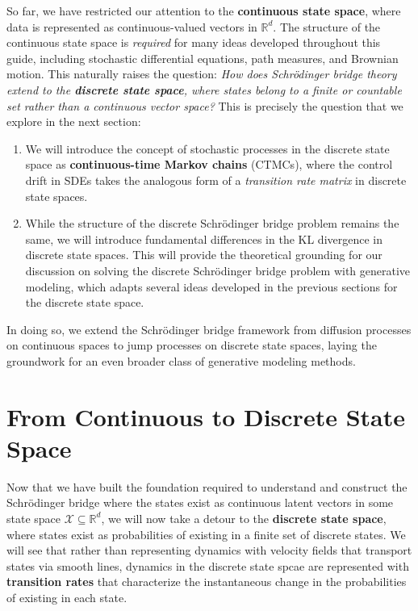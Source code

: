 \documentclass{article}
\begin{document}
So far, we have restricted our attention to the \textbf{continuous state space}, where data is represented as continuous-valued vectors in $\mathbb{R}^d$. The structure of the continuous state space is \textit{required} for many ideas developed throughout this guide, including stochastic differential equations, path measures, and Brownian motion. This naturally raises the question: \textit{How does Schrödinger bridge theory extend to the \textbf{discrete state space}, where states belong to a finite or countable set rather than a continuous vector space?} This is precisely the question that we explore in the next section:
\begin{enumerate}
    \item [(i)] We will introduce the concept of stochastic processes in the discrete state space as \textbf{continuous-time Markov chains} (CTMCs), where the control drift in SDEs takes the analogous form of a \textit{transition rate matrix} in discrete state spaces.
    \item[(ii)] While the structure of the discrete Schrödinger bridge problem remains the same, we will introduce fundamental differences in the KL divergence in discrete state spaces. This will provide the theoretical grounding for our discussion on solving the discrete Schrödinger bridge problem with generative modeling, which adapts several ideas developed in the previous sections for the discrete state space.
\end{enumerate}

In doing so, we extend the Schrödinger bridge framework from diffusion processes on continuous spaces to jump processes on discrete state spaces, laying the groundwork for an even broader class of generative modeling methods.

\newpage
\section{From Continuous to Discrete State Space}
\label{sec:discrete-state-space}
Now that we have built the foundation required to understand and construct the Schrödinger bridge where the states exist as continuous latent vectors in some state space $\mathcal{X}\subseteq \mathbb{R}^d$, we will now take a detour to the \textbf{discrete state space}, where states exist as probabilities of existing in a finite set of discrete states. We will see that rather than representing dynamics with velocity fields that transport states via smooth lines, dynamics in the discrete state spcae are represented with \textbf{transition rates} that characterize the instantaneous change in the probabilities of existing in each state. 
\end{document}
